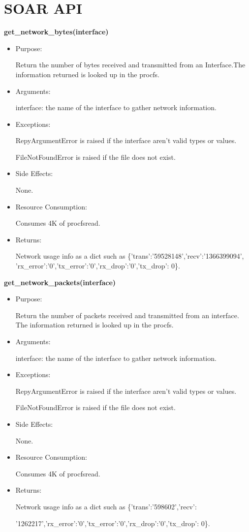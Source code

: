 \chapter{SOAR API}
\label{AppendixA}
\textbf{get\_network\_bytes(interface)}
\begin{itemize}
\item Purpose:

Return the number of bytes received and transmitted from an Interface.The
information returned is looked up in the procfs.

\item Arguments:

interface: the name of the interface to gather network information.

\item Exceptions:

RepyArgumentError is raised if the interface aren't valid types or values.

FileNotFoundError is raised if the file does not exist.

\item Side Effects:

None.

\item Resource Consumption:

Consumes 4K of procfsread.

\item Returns:

Network usage info as a dict such as \{'trans':'59528148','recv':'1366399094',
'rx\_error':'0','tx\_error':'0','rx\_drop':'0','tx\_drop': 0\}.
\end{itemize}

\textbf{get\_network\_packets(interface)}
\begin{itemize}
\item Purpose:

Return the number of packets received and transmitted from an interface.
The information returned is looked up in the procfs.

\item Arguments:

interface: the name of the interface to gather network information.

\item Exceptions:

RepyArgumentError is raised if the interface aren't valid types or values.

FileNotFoundError is raised if the file does not exist.

\item Side Effects:

None.

\item Resource Consumption:

Consumes 4K of procfsread.

\item Returns:

Network usage info as a dict such as \{'trans':'598602','recv':

'1262217','rx\_error':'0','tx\_error':'0','rx\_drop':'0','tx\_drop': 0\}.
\end{itemize}

